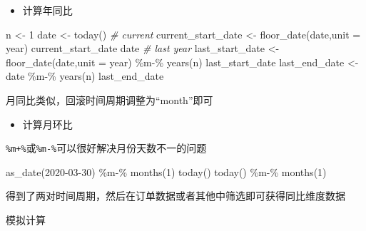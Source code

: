 \documentclass[
]{book}
\newenvironment{Shaded}{\begin{snugshade}}{\end{snugshade}}
\newcommand{\AttributeTok}[1]{\textcolor[rgb]{0.77,0.63,0.00}{#1}}
\newcommand{\CommentTok}[1]{\textcolor[rgb]{0.56,0.35,0.01}{\textit{#1}}}
\newcommand{\DecValTok}[1]{\textcolor[rgb]{0.00,0.00,0.81}{#1}}
\newcommand{\FunctionTok}[1]{\textcolor[rgb]{0.00,0.00,0.00}{#1}}
\newcommand{\NormalTok}[1]{#1}
\newcommand{\OtherTok}[1]{\textcolor[rgb]{0.56,0.35,0.01}{#1}}
\newcommand{\SpecialCharTok}[1]{\textcolor[rgb]{0.00,0.00,0.00}{#1}}
\newcommand{\StringTok}[1]{\textcolor[rgb]{0.31,0.60,0.02}{#1}}
\providecommand{\tightlist}{%
  \setlength{\itemsep}{0pt}\setlength{\parskip}{0pt}}
\begin{document}
\begin{itemize}
\tightlist
\item
  计算年同比
\end{itemize}

\begin{Shaded}
\begin{Highlighting}[]
\NormalTok{n }\OtherTok{\textless{}{-}} \DecValTok{1} 
\NormalTok{date }\OtherTok{\textless{}{-}} \FunctionTok{today}\NormalTok{()}
\CommentTok{\# current }
\NormalTok{current\_start\_date }\OtherTok{\textless{}{-}}  \FunctionTok{floor\_date}\NormalTok{(date,}\AttributeTok{unit =} \StringTok{\textquotesingle{}year\textquotesingle{}}\NormalTok{)}
\NormalTok{current\_start\_date}
\NormalTok{date }
\CommentTok{\# last year}
\NormalTok{last\_start\_date }\OtherTok{\textless{}{-}} \FunctionTok{floor\_date}\NormalTok{(date,}\AttributeTok{unit =} \StringTok{\textquotesingle{}year\textquotesingle{}}\NormalTok{) }\SpecialCharTok{\%m{-}\%} \FunctionTok{years}\NormalTok{(n)}
\NormalTok{last\_start\_date}
\NormalTok{last\_end\_date }\OtherTok{\textless{}{-}}\NormalTok{ date }\SpecialCharTok{\%m{-}\%} \FunctionTok{years}\NormalTok{(n)}
\NormalTok{last\_end\_date}
\end{Highlighting}
\end{Shaded}

月同比类似，回滚时间周期调整为``month''即可

\begin{itemize}
\tightlist
\item
  计算月环比
\end{itemize}

\texttt{\%m+\%}或\texttt{\%m-\%}可以很好解决月份天数不一的问题

\begin{Shaded}
\begin{Highlighting}[]
\FunctionTok{as\_date}\NormalTok{(}\StringTok{\textquotesingle{}2020{-}03{-}30\textquotesingle{}}\NormalTok{) }\SpecialCharTok{\%m{-}\%} \FunctionTok{months}\NormalTok{(}\DecValTok{1}\NormalTok{)}
\FunctionTok{today}\NormalTok{()}
\FunctionTok{today}\NormalTok{() }\SpecialCharTok{\%m{-}\%} \FunctionTok{months}\NormalTok{(}\DecValTok{1}\NormalTok{)}
\end{Highlighting}
\end{Shaded}

得到了两对时间周期，然后在订单数据或者其他中筛选即可获得同比维度数据

模拟计算
\end{document}
